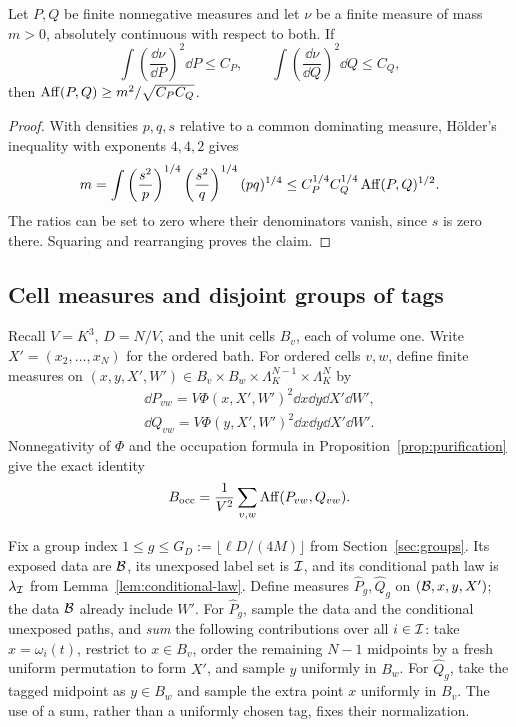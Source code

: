 \begin{lemma}\label{lem:affinity}
Let $P,Q$ be finite nonnegative measures and let $\nu$ be a finite measure
of mass $m>0$, absolutely continuous with respect to both. If
\[
 \int\left(\frac{\dd\nu}{\dd P}\right)^2\dd P\le C_P,
 \qquad
 \int\left(\frac{\dd\nu}{\dd Q}\right)^2\dd Q\le C_Q,
\]
then $\operatorname{Aff}(P,Q)\ge m^2/\sqrt{C_PC_Q}$.
\end{lemma}
\begin{proof}
With densities $p,q,s$ relative to a common dominating measure, H\"older's
inequality with exponents $4,4,2$ gives
\[
 m=\int
 \left(\frac{s^2}{p}\right)^{1/4}
 \left(\frac{s^2}{q}\right)^{1/4}(pq)^{1/4}
 \le C_P^{1/4}C_Q^{1/4}\operatorname{Aff}(P,Q)^{1/2}.
\]
The ratios can be set to zero where their denominators vanish, since $s$ is
zero there. Squaring and rearranging proves the claim.
\end{proof}

\subsection{Cell measures and disjoint groups of tags}

Recall $V=K^3$, $D=N/V$, and the unit cells $B_v$, each of volume one.
Write $X'=(x_2,\ldots,x_N)$ for the ordered bath. For ordered cells $v,w$,
define finite measures on
$(x,y,X',W')\in B_v\times B_w\times\Lambda_K^{N-1}\times\Lambda_K^N$ by
\begin{equation}\label{cmp:cell-measures}
\begin{aligned}
 \dd P_{vw}=V\Phi(x,X',W')^2\dd x\dd y\dd X'\dd W',
 \\
 \dd Q_{vw}=V\Phi(y,X',W')^2\dd x\dd y\dd X'\dd W'.
\end{aligned}
\end{equation}
Nonnegativity of $\Phi$ and the occupation formula in
Proposition~\ref{prop:purification} give the exact identity
\begin{equation}\label{cmp:cell-affinity}
 B_{\rm occ}=\frac1{V^2}\sum_{v,w}\operatorname{Aff}(P_{vw},Q_{vw}).
\end{equation}

Fix a group index
$1\le g\le G_D:=\lfloor\ell D/(4M)\rfloor$ from
Section~\ref{sec:groups}. Its exposed data are $\mathcal B$, its unexposed label
set is $\mathcal I$, and its conditional path law is $\lambda_{\mathcal I}$ from
Lemma~\ref{lem:conditional-law}. Define measures
$\widehat P_g,\widehat Q_g$ on $(\mathcal B,x,y,X')$; the data $\mathcal B$ already
include $W'$.
For $\widehat P_g$, sample the data and the conditional unexposed paths, and
\emph{sum} the following contributions over all $i\in\mathcal I$:
take $x=\omega_i(t)$, restrict to $x\in B_v$, order the remaining $N-1$
midpoints by a fresh uniform permutation to form $X'$, and sample $y$
uniformly in $B_w$. For $\widehat Q_g$, take the tagged midpoint as
$y\in B_w$ and sample the extra point $x$ uniformly in $B_v$.
The use of a sum, rather than a uniformly chosen tag, fixes their
normalization.

